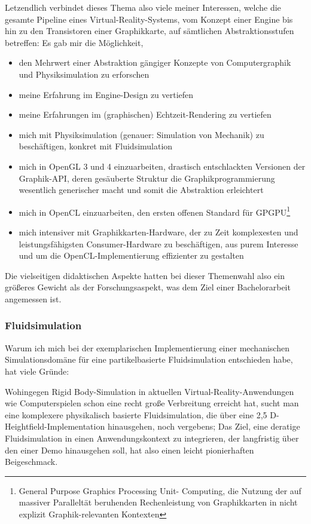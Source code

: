 Letzendlich verbindet dieses Thema also viele meiner Interessen, welche die gesamte Pipeline eines Virtual-Reality-Systems,  vom Konzept einer Engine bis hin zu den Transistoren einer Graphikkarte, auf sämtlichen Abstraktionsstufen betreffen: Es gab mir die Möglichkeit,
\begin{itemize}
	\item den Mehrwert einer Abstraktion gängiger Konzepte von Computergraphik und Physiksimulation zu erforschen
	\item meine Erfahrung im Engine-Design zu vertiefen
	\item meine Erfahrungen im (graphischen) Echtzeit-Rendering zu vertiefen
	\item mich mit Physiksimulation (genauer: Simulation von Mechanik) zu beschäftigen, konkret mit Fluidsimulation
	
	\item mich in OpenGL 3 und 4 einzuarbeiten, drastisch entschlackten Versionen der Graphik-API, deren gesäuberte Struktur die Graphikprogrammierung wesentlich generischer macht und somit die Abstraktion erleichtert
	\item mich in OpenCL einzuarbeiten, den ersten offenen Standard für \linebreak GPGPU\footnote{General Purpose Graphics Processing Unit- Computing, die Nutzung der auf massiver Paralleltät beruhenden Rechenleistung von Graphikkarten in nicht explizit Graphik-relevanten Kontexten}
	\item  mich intensiver mit Graphikkarten-Hardware, der zu Zeit komplexesten und leistungsfähigsten Consumer-Hardware zu beschäftigen, aus purem Interesse und um die OpenCL-Implementierung effizienter zu gestalten
\end{itemize}
Die vielseitigen didaktischen Aspekte hatten bei dieser Themenwahl also ein größeres Gewicht als der Forschungsaspekt, was dem Ziel einer Bachelorarbeit angemessen ist. 


\subsubsection{Fluidsimulation}

Warum ich mich bei der exemplarischen Implementierung einer mechanischen Simulationsdomäne für eine partikelbasierte Fluidsimulation entschieden habe, hat viele Gründe:

Wohingegen Rigid Body-Simulation in aktuellen Virtual-Reality-Anwendungen wie Computerspielen schon eine recht große Verbreitung erreicht hat, sucht man eine komplexere physikalisch basierte Fluidsimulation, die über eine 2,5 D- Heightfield-Implementation hinausgehen, noch vergebens; 
Das Ziel, eine deratige Fluidsimulation in einen Anwendungskontext zu integrieren, der langfristig über den einer Demo hinausgehen soll, hat also einen leicht pionierhaften Beigeschmack.

